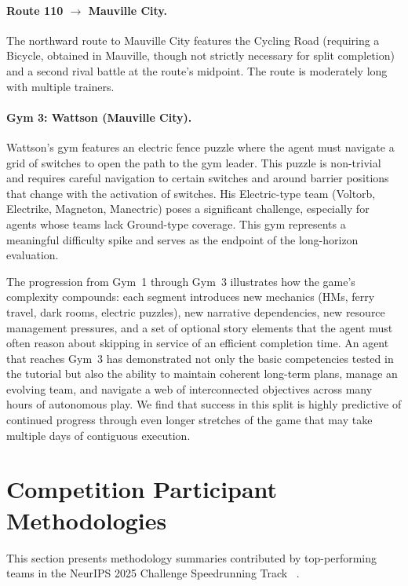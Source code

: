 \paragraph{Route 110 $\to$ Mauville City.} The northward route to Mauville City features the Cycling Road (requiring a Bicycle, obtained in Mauville, though not strictly necessary for split completion) and a second rival battle at the route's midpoint. The route is moderately long with multiple trainers.

\paragraph{Gym 3: Wattson (Mauville City).} Wattson's gym features an electric fence puzzle where the agent must navigate a grid of switches to open the path to the gym leader. This puzzle is non-trivial and requires careful navigation to certain switches and around barrier positions that change with the activation of switches. His Electric-type team (Voltorb, Electrike, Magneton, Manectric) poses a significant challenge, especially for agents whose teams lack Ground-type coverage. This gym represents a meaningful difficulty spike and serves as the endpoint of the long-horizon evaluation.

\vspace{1em}
The progression from Gym~1 through Gym~3 illustrates how the game's complexity compounds: each segment introduces new mechanics (HMs, ferry travel, dark rooms, electric puzzles), new narrative dependencies, new resource management pressures, and a set of optional story elements that the agent must often reason about skipping in service of an efficient completion time. An agent that reaches Gym~3 has demonstrated not only the basic competencies tested in the tutorial but also the ability to maintain coherent long-term plans, manage an evolving team, and navigate a web of interconnected objectives across many hours of autonomous play. We find that success in this split is highly predictive of continued progress through even longer stretches of the game that may take multiple days of contiguous execution.

\section{Competition Participant Methodologies}\label{sec:appendix_competitor_methods}

This section presents methodology summaries contributed by top-performing teams in the NeurIPS 2025 \pokeagent{} Challenge Speedrunning Track ~\citep{karten2025pokeagent}.

